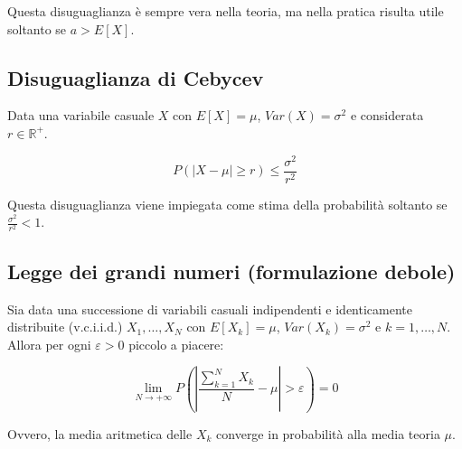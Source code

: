 \documentclass{article}
\begin{document}
\noindent
Questa disuguaglianza è sempre vera nella teoria, ma nella pratica risulta utile soltanto se $a > E[X]$.

\subsection{Disuguaglianza di Cebycev}

Data una variabile casuale $X$ con $E[X]=\mu$, $Var(X)=\sigma^2$ e considerata $r \in \mathbb{R}^+$.

$$
P(|X - \mu| \geq r) \leq \frac{\sigma^2}{r^2}
$$

\noindent
Questa disuguaglianza viene impiegata come stima della probabilità soltanto se $\frac{\sigma^2}{r^2} < 1$.

\subsection{Legge dei grandi numeri (formulazione debole)}

Sia data una successione di variabili casuali indipendenti e identicamente distribuite (v.c.i.i.d.) $X_1, \dots, X_N$ con $E[X_k]=\mu$, $Var(X_k)=\sigma^2$ e $k = 1,\dots,N$.
Allora per ogni $\varepsilon > 0$ piccolo a piacere:

$$
\lim_{N\to+\infty}P(|\frac{\sum^N_{k=1}X_k}{N} - \mu| > \varepsilon) = 0
$$

\noindent
Ovvero, la media aritmetica delle $X_k$ converge in probabilità alla media teoria $\mu$.
\end{document}
